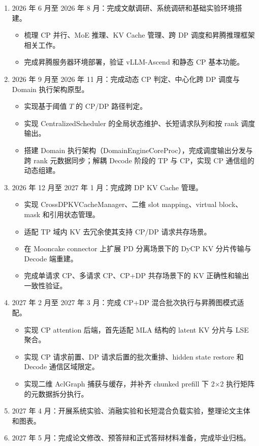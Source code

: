 \begin{enumerate}
    \item 2026 年 6 月至 2026 年 8 月：完成文献调研、系统调研和基础实验环境搭建。
    \begin{itemize}
        \item 梳理 CP 并行、MoE 推理、KV Cache 管理、跨 DP 调度和昇腾推理框架相关工作。
        \item 完成昇腾服务器环境部署，验证 vLLM-Ascend 和静态 CP 基本功能。
    \end{itemize}
    \item 2026 年 9 月至 2026 年 11 月：完成动态 CP 判定、中心化跨 DP 调度与 Domain 执行架构原型。
    \begin{itemize}
        \item 实现基于阈值 $T$ 的 CP/DP 路径判定。
        \item 实现 CentralizedScheduler 的全局状态维护、长短请求队列和按 rank 调度输出。
        \item 搭建 Domain 执行架构（DomainEngineCoreProc），完成调度输出分发与跨 rank 元数据同步；解耦 Decode 阶段的 TP 与 CP，实现 CP 通信组的动态组建。
    \end{itemize}
    \item 2026 年 12 月至 2027 年 1 月：完成跨 DP KV Cache 管理。
    \begin{itemize}
        \item 实现 CrossDPKVCacheManager、二维 slot mapping、virtual block、mask 和引用状态管理。
        \item 适配 TP 域内 KV 去冗余使其支持 CP/DP 请求共存场景。
        \item 在 Mooncake connector 上扩展 PD 分离场景下的 DyCP KV 分片传输与 Decode 端重建。
        \item 完成单请求 CP、多请求 CP、CP+DP 共存场景下的 KV 正确性和输出一致性验证。
    \end{itemize}
    \item 2027 年 2 月至 2027 年 3 月：完成 CP+DP 混合批次执行与昇腾图模式适配。
    \begin{itemize}
        \item 实现 CP attention 后端，首先适配 MLA 结构的 latent KV 分片与 LSE 聚合。
        \item 实现 CP 请求前置、DP 请求后置的批次重排、hidden state restore 和 Decode 通信区域限定。
        \item 实现二维 AclGraph 捕获与缓存，并补齐 chunked prefill 下 2$\times$2 执行矩阵的元数据拆分执行。
    \end{itemize}
    \item 2027 年 4 月：开展系统实验、消融实验和长短混合负载实验，整理论文主体和图表。
    \item 2027 年 5 月：完成论文修改、预答辩和正式答辩材料准备，完成毕业归档。
\end{enumerate}

